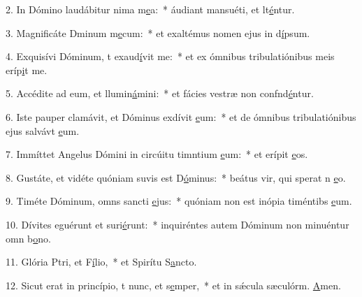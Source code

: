2. In Dómino laudábitur nima m\uline{e}a:~* áudiant mansuéti, et lt\uline{é}ntur.\par 
3. Magnificáte Dminum m\uline{e}cum:~* et exaltémus nomen ejus in d\uline{í}psum.\par 
4. Exquisívi Dóminum, t exaud\uline{í}vit me:~* et ex ómnibus tribulatiónibus meis eríp\uline{i}t me.\par 
5. Accédite ad eum, et llumin\uline{á}mini:~* et fácies vestræ non confnd\uline{é}ntur.\par 
6. Iste pauper clamávit, et Dóminus exdívit \uline{e}um:~* et de ómnibus tribulatiónibus ejus salvávt \uline{e}um.\par 
7. Immíttet Angelus Dómini in circúitu timntium \uline{e}um:~* et erípit \uline{e}os.\par 
8. Gustáte, et vidéte quóniam suvis est D\uline{ó}minus:~* beátus vir, qui sperat n \uline{e}o.\par 
9. Timéte Dóminum, omns sancti \uline{e}jus:~* quóniam non est inópia timéntibs \uline{e}um.\par 
10. Dívites eguérunt et suri\uline{é}runt:~* inquiréntes autem Dóminum non minuéntur omn b\uline{o}no.\par 
11. Glória Ptri, et F\uline{í}lio,~* et Spirítu S\uline{a}ncto.\par 
12. Sicut erat in princípio, t nunc, et s\uline{e}mper,~* et in sǽcula sæculórm. \uline{A}men.\par 
